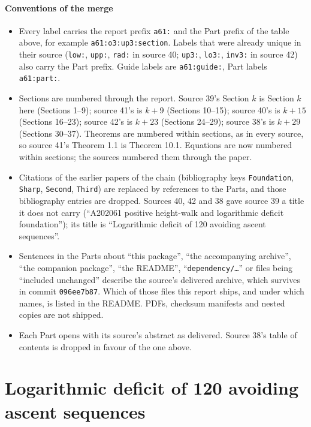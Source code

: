 \documentclass[11pt,letterpaper]{article}
\numberwithin{equation}{section}
\theoremstyle{remark}\newtheorem{remark}[theorem]{Remark}
\begin{document}
\subsection*{Conventions of the merge}
\label{a61:guide:conventions}
\begin{itemize}
\item Every label carries the report prefix \texttt{a61:} and the Part prefix of the table above, for example \texttt{a61:o3:up3:section}. Labels that were already unique in their source (\texttt{low:}, \texttt{upp:}, \texttt{rad:} in source 40; \texttt{up3:}, \texttt{lo3:}, \texttt{inv3:} in source 42) also carry the Part prefix. Guide labels are \texttt{a61:guide:}, Part labels \texttt{a61:part:}.
\item Sections are numbered through the report. Source 39's Section $k$ is Section $k$ here (Sections 1--9); source 41's is $k+9$ (Sections 10--15); source 40's is $k+15$ (Sections 16--23); source 42's is $k+23$ (Sections 24--29); source 38's is $k+29$ (Sections 30--37). Theorems are numbered within sections, as in every source, so source 41's Theorem 1.1 is Theorem 10.1. Equations are now numbered within sections; the sources numbered them through the paper.
\item Citations of the earlier papers of the chain (bibliography keys \texttt{Foundation}, \texttt{Sharp}, \texttt{Second}, \texttt{Third}) are replaced by references to the Parts, and those bibliography entries are dropped. Sources 40, 42 and 38 gave source 39 a title it does not carry (``A202061 positive height-walk and logarithmic deficit foundation''); its title is ``Logarithmic deficit of 120 avoiding ascent sequences''.
\item Sentences in the Parts about ``this package'', ``the accompanying archive'', ``the companion package'', ``the README'', ``\texttt{dependency/\ldots}'' or files being ``included unchanged'' describe the source's delivered archive, which survives in commit \texttt{096ee7b87}. Which of those files this report ships, and under which names, is listed in the README. PDFs, checksum manifests and nested copies are not shipped.
\item Each Part opens with its source's abstract as delivered. Source 38's table of contents is dropped in favour of the one above.
\end{itemize}


\part{Logarithmic deficit of 120 avoiding ascent sequences}\label{a61:part:fd}
\end{document}
